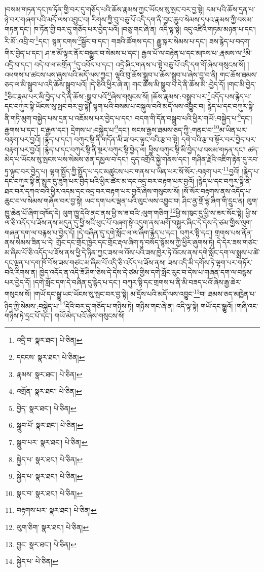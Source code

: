 །བསམ་གཏན་དང་ཁ་ཏོན་གྱི་བར་དུ་གཅོད་པའི་ཆོས་རྣམས་ཀྱང་ཡོངས་སུ་སྤང་བར་བྱ་སྟེ། དམ་པའི་ཆོས་དྲན་པ་ཉེ་བར་གཞག་པའི་མདོ་ལས་འབྱུང་བ། རིགས་ཀྱི་བུ་བཅུ་པོ་འདི་དག་ནི་བྱང་ཆུབ་སེམས་དཔའ་རྣམས་ཀྱི་བསམ་གཏན་དང་། ཁ་ཏོན་གྱི་བར་དུ་གཅོད་པར་བྱེད་པའོ། །བཅུ་གང་ཞེ་ན། འདི་ལྟ་སྟེ། འདུ་འཛིའི་གཏམ་མཉན་པ་དང་། རི་མོ་:འབྲི་བ་\footnote{འདྲི་བ་  སྣར་ཐང་།  པེ་ཅིན། }དང་། སྙན་ངགས་\footnote{དངངས་  སྣར་ཐང་།  པེ་ཅིན། }སྦྱོར་བ་དང་། གཟའི་ཚོགས་དང་། རྒྱུ་སྐར་སེམས་པ་དང་། ཟས་རྙེད་པ་བདག་གིར་བྱེད་པ་དང་། ཤ་ཟ་མོ་ལྟར་ནོར་བསྒྱུར་བ་སེམས་པ་དང་། རྒྱལ་པོ་ལ་བརྟེན་པ་དང་མཁས་པ་:རྣམས་ལ་\footnote{རྣམས་  སྣར་ཐང་།  པེ་ཅིན། }མི་འདྲི་བ་དང་། བདེ་བ་ལ་མགྲོན་\footnote{འགྲོན་  སྣར་ཐང་།  པེ་ཅིན། }དུ་འབོད་པ་དང་། འདྲེ་ཞིང་གནས་པ་སྟེ་བཅུ་པོ་འདི་དག་གོ་ཞེས་གསུངས་སོ། །འཕགས་པ་ཚངས་པས་ཞུས་པའི་མདོ་ལས་ཀྱང་། ལྷའི་བུ་ཆོས་སྒྲུབ་པ་ཆོས་སྒྲུབ་པ་ཞེས་བྱ་བ་ནི། གང་ཆོས་ཐམས་ཅད་ལ་མི་སྒྲུབ་པ་འདི་ཆོས་སྒྲུབ་པའོ། །དེ་ཅིའི་ཕྱིར་ཞེ་ན། གང་ཆོས་མི་སྒྲུབ་པ་དེ་ནི་ཆོས་མི་:བྱེད་དོ། །གང་མི་བྱེད་\footnote{བྱེད་  སྣར་ཐང་།  པེ་ཅིན། }ཅིང་རྣམ་པར་མི་བྱེད་པ་དེ་ནི་ཆོས་:སྒྲུབ་པའོ་\footnote{སྒྲུབ་པོ་  སྣར་ཐང་།  པེ་ཅིན། }ཞེས་གསུངས་སོ། །ཆོས་རྣམས་:བསྒྲུབ་པར་\footnote{སྒྲུབ་པར་  སྣར་ཐང་།  པེ་ཅིན། }འདོད་པས་རྙེད་པ་དང་བཀུར་སྟི་ཡོངས་སུ་སྤང་བར་བྱ་སྟེ། ལྷག་པའི་བསམ་པ་བསྐུལ་བའི་མདོ་ལས་འབྱུང་བ། རྙེད་པ་དང་བཀུར་སྟི་ནི་གཏི་མུག་བསྐྱེད་པས་དྲན་པ་འཇོམས་པར་བྱེད་པ་དང་། བདག་གི་དོན་བསྒྲུབ་པའི་ཕྱིར་གཡོ་:བསྐྱེད་པ་\footnote{སྐྱེད་པ་  སྣར་ཐང་།  པེ་ཅིན། }དང་། རྒྱགས་པ་དང་། ང་རྒྱལ་དང་། དྲེགས་པ་:བསྐྱེད་པ་\footnote{སྐྱེད་པ་  སྣར་ཐང་།  པེ་ཅིན། }དང་། སངས་རྒྱས་ཐམས་ཅད་ཀྱི་:གནང་བ་\footnote{སྣང་བ་  སྣར་ཐང་།  པེ་ཅིན། }མ་ཡིན་པར་བརྟག་པར་བྱའོ། །རྙེད་པ་དང་། བཀུར་སྟི་ནི་གདོན་མི་ཟ་བར་ལྟུང་བའི་རྩ་བ་སྟེ། དགེ་བའི་རྩ་བ་སྟོར་བར་བྱེད་པར་བརྟག་པར་བྱའོ། །རྙེད་པ་དང་བཀུར་སྟི་ནི་སྔར་བཀུར་སྟི་བྱེད་ལ། ཕྱིས་བཀུར་སྟི་མི་བྱེད་པ་བསམ་གཏན་དང་། ཚད་མེད་པ་ཡོངས་སུ་སྤངས་པས་སེམས་ཅན་དམྱལ་བ་དང་། དུད་འགྲོའི་སྐྱེ་གནས་དང་། གཤིན་རྗེའི་འཇིག་རྟེན་དུ་རབ་ཏུ་ལྟུང་བར་བྱེད་པ། ལྷག་སྤྱོད་ཀྱི་སྤྱོད་པ་དང་མཚུངས་པར་གནས་པ་ཡིན་པར་སོ་སོར་:བརྟག་པར་\footnote{བརྟགས་པར་  སྣར་ཐང་།  པེ་ཅིན། }བྱའོ། །རྙེད་པ་དང་བཀུར་སྟི་ནི་མྱུར་དུ་ཟུག་པར་བྱེད་པའི་ཕྱིར་ཚེར་མ་དང་འདྲ་བར་བརྟག་པར་བྱའོ། །རྙེད་པ་དང་བཀུར་སྟི་ནི་ཐར་བར་དཀའ་བའི་ཕྱིར་འདམ་དང་འདྲ་བར་བརྟག་པར་བྱའོ་ཞེས་གསུངས་སོ། །སོ་སོར་བརྟགས་ནས་འདོད་པ་ཆུང་བ་ལ་སེམས་གཞོལ་བར་བྱ་སྟེ། ཡང་དག་པར་ལྡན་པའི་ལུང་ལས་འབྱུང་བ། ཤིང་ནྱ་གྲོ་དྷ་ཞིག་གི་དྲུང་ན། ལུག་ཁྱུ་ཆེན་པོ་ཞིག་འཁོད་དེ། ལུག་ཁྱུ་དེའི་ནང་ནས་ཕྱི་ས་ཟ་བའི་:ལུག་གཅིག་\footnote{ལུག་ཅིག་  སྣར་ཐང་།  པེ་ཅིན། }ཕྱི་ས་ཁུང་དུ་ཕྱི་ས་ཟར་སོང་སྟེ། ཕྱི་ས་ལ་ཅི་འདོད་པ་ཟོས་ནས་མདུན་དུ་ཕྱི་སའི་ཕུང་པོ་བཞག་སྟེ་འདུག་ནས་མགོ་བསྒྱུར་ཞིང་དེ་དེས་དེ་ཙམ་གྱིས་ལུག་གཞན་དག་ལ་བརྙས་པ་བྱེད་དོ། །དེ་བཞིན་དུ་དགེ་སློང་ལ་ལ་ཞིག་རྙེད་པ་དང་། བཀུར་སྟི་དང་། གྲགས་པས་ནོན་ནས་སེམས་ཟིན་པ་དེ། གྲོང་དང་གྲོང་ཁྱེར་དང་གྲོང་རྡལ་ཞིག་ཏུ་བསོད་སྙོམས་ཀྱི་ཕྱིར་ཞུགས་ཏེ། དེ་དེར་ཟས་གཙང་མ་ཞིམ་པོ་ཅི་འདོད་པ་ཟོས་ནས་ཕྱི་དེ་ཉིན་ཀྱང་ཟས་ལ་འོས་པའི་ཟས་ཁྱེར་ཏེ་འོངས་ནས་དགེ་སློང་དག་ལ་སྨྲས་པ་ཚེ་དང་ལྡན་པ་དག་ཁོ་བོས་ཟས་གཙང་མ་ཞིམ་པོ་འདི་ཅི་འདོད་པ་ཟོས་ནས། ཟས་འདི་མི་དགོས་ཏེ་ལྷག་པར་གཏོར་བའི་རིགས་ན། ཁྱེད་འདོད་ན་འདི་ཟོ་ཤིག་ཅེས་དེ་དེས་དེ་ཙམ་གྱིས་དགེ་སློང་རུང་བ་དེས་པ་གཞན་དག་ལ་བརྙས་པར་བྱེད་དོ། །དགེ་སློང་དག་དེ་བཞིན་དུ་རྙེད་པ་དང་། བཀུར་སྟི་དང་གྲགས་པ་ནི་མི་བཟད་པའོ་ཞེས་རྒྱ་ཆེར་གསུངས་སོ། །གཡོ་དང་སྒྱུ་ཡང་ཡོངས་སུ་སྤང་བར་བྱ་སྟེ། མ་དྲོས་པའི་མདོ་ལས་འབྱུང་\footnote{བྱུང་  སྣར་ཐང་།  པེ་ཅིན། }བ། ཐམས་ཅད་མཁྱེན་པ་ཉིད་ཀྱི་སེམས་:བསྐྱེད་པ་\footnote{སྐྱེད་པ་  པེ་ཅིན། }དེའི་བར་དུ་གཅོད་པ་གཉིས་ཏེ། གཉིས་གང་ཞེ་ན། འདི་ལྟ་སྟེ། གཡོ་དང་སྒྱུའོ། །གཞི་འང་གཉིས་ཏེ་དྲང་པོ་དང་། གཡོ་མེད་པའོ་ཞེས་གསུངས་སོ། 